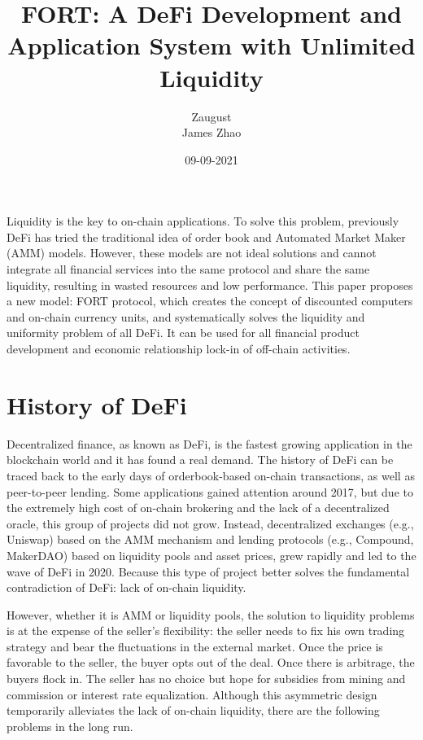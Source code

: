 \documentclass[letterpaper,12pt]{article}
\begin{document}
\title{FORT: A DeFi Development and Application System with Unlimited Liquidity}
\author{Zaugust \\ James Zhao}
\date{09-09-2021}
\maketitle

\noindent Liquidity is the key to on-chain applications. 
To solve this problem, previously DeFi has tried the traditional idea of order book and Automated Market Maker (AMM) models. 
However, these models are not ideal solutions and cannot integrate all financial services into the same protocol and share the same liquidity, resulting in wasted resources and low performance. 
This paper proposes a new model: FORT protocol, which creates the concept of discounted computers and on-chain currency units, and systematically solves the liquidity and uniformity problem of all DeFi. 
It can be used for all financial product development and economic relationship lock-in of off-chain activities.

\section{History of DeFi}

Decentralized finance, as known as DeFi, is the fastest growing application in the blockchain world and it has found a real demand. 
The history of DeFi can be traced back to the early days of orderbook-based on-chain transactions, as well as peer-to-peer lending.  
Some applications gained attention around 2017, but due to the extremely high cost of on-chain brokering and the lack of a decentralized oracle, this group of projects did not grow. 
Instead, decentralized exchanges (e.g., Uniswap) based on the AMM mechanism and lending protocols (e.g., Compound, MakerDAO) based on liquidity pools and asset prices, grew rapidly and led to the wave of DeFi in 2020. 
Because this type of project better solves the fundamental contradiction of DeFi: lack of on-chain liquidity.

However, whether it is AMM or liquidity pools, the solution to liquidity problems is at the expense of the seller's flexibility: the seller needs to fix his own trading strategy and bear the fluctuations in the external market. 
Once the price is favorable to the seller, the buyer opts out of the deal. Once there is arbitrage, the buyers flock in. 
The seller has no choice but hope for subsidies from mining and commission or interest rate equalization. 
Although this asymmetric design temporarily alleviates the lack of on-chain liquidity, there are the following problems in the long run. 
\end{document}
